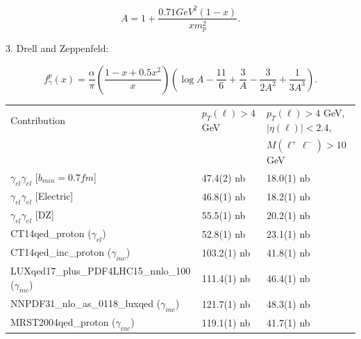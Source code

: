 \begin{equation}
A = 1+\frac{0.71 GeV^2(1-x)}{x m_p^2}.
\nonumber
\end{equation}

3. Drell and Zeppenfeld:

\begin{equation}
f_\gamma^{p}(x) = \frac{\alpha}{\pi}
\left(
\frac{1-x+0.5x^2}{x}
\right)
\left(
\log{A}-\frac{11}{6}+\frac{3}{A}-\frac{3}{2A^2}+\frac{1}{3A^3}
\right).
\nonumber
\end{equation}

\begin{table}[!ht]
\begin{center}
\begin{tabular}{|l|l|l|}
\hline
Contribution & $p_T(\ell) > 4$ GeV & $p_T(\ell) > 4$ GeV, $|\eta(\ell)| < 2.4$,\\
& & $M(\ell^+\ell^-) > 10$ GeV\\
\hline
$\gamma_{el}\gamma_{el}$ [$b_{min}=0.7fm$] & 47.4(2) nb & 18.0(1) nb\\
\hline
$\gamma_{el}\gamma_{el}$ [Electric] & 46.8(1) nb & 18.2(1) nb\\
\hline
$\gamma_{el}\gamma_{el}$ [DZ] & 55.5(1) nb & 20.2(1) nb\\
\hline
CT14qed\_proton ($\gamma_{el}$)& 52.8(1) nb & 23.1(1) nb\\
\hline
CT14qed\_inc\_proton ($\gamma_{inc}$)& 103.2(1) nb & 41.8(1) nb\\
\hline
LUXqed17\_plus\_PDF4LHC15\_nnlo\_100 ($\gamma_{inc}$)& 111.4(1) nb & 46.4(1) nb\\
\hline
NNPDF31\_nlo\_as\_0118\_luxqed ($\gamma_{inc}$) & 121.7(1) nb & 48.3(1) nb\\
\hline
MRST2004qed\_proton ($\gamma_{inc}$) & 119.1(1) nb & 41.7(1) nb\\
\hline
\end{tabular}
\end{center}
\end{table}

\clearpage

